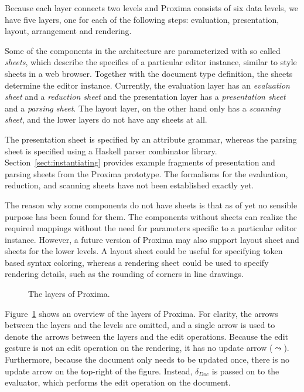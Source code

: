 \documentclass{speauth}
\begin{document}



Because each layer connects two levels and Proxima  consists of six data levels, we have five layers, one for each of the following steps: evaluation, presentation, layout, arrangement and rendering.

Some of the components in the architecture are parameterized with so called {\em sheets}, which describe the specifics of a particular editor instance, similar to style sheets in a web browser. Together with the document type definition, the sheets determine the editor instance. Currently, the evaluation layer has an {\em evaluation sheet} and a {\em reduction sheet} and the presentation layer has a {\em presentation sheet} and a {\em parsing sheet}.  The layout layer, on the other hand only has a {\em scanning sheet}, and the lower layers do not have any sheets at all. 

The presentation sheet is specified by an attribute grammar, whereas the parsing sheet is specified using a Haskell parser combinator library. Section~\ref{sect:instantiating} provides example fragments of presentation and parsing sheets from the Proxima prototype. The formalisms for the evaluation, reduction, and scanning sheets have not been established exactly yet.

The reason why some components do not have sheets is that as of yet no sensible purpose has been found for them. The components without sheets can realize the required mappings without the need for parameters specific to a particular editor instance. However, a future version of Proxima may also support layout sheet and sheets for the lower levels. A layout sheet could be useful for specifying token based syntax coloring, whereas a rendering sheet could be used to specify rendering details, such as the rounding of corners in line drawings.

\begin{figure}
\begin{small}
\begin{center}
\begin{center}
\end{center}\caption{The layers of Proxima.}\label{proxLayers} 
\end{center}
\end{small}
\end{figure}

Figure~\ref{proxLayers} shows an overview of the layers of Proxima. For clarity, the arrows between the layers and the levels are omitted, and a single arrow is used to denote the arrows between the layers and the edit operations. Because the edit gesture is not an edit operation on the rendering, it has no update arrow ($\leadsto$). Furthermore, because the document only needs to be updated once, there is no update arrow on the top-right of the figure. Instead, $\delta_{Doc}$ is passed on to the evaluator, which performs the edit operation on the document.
\end{document}

